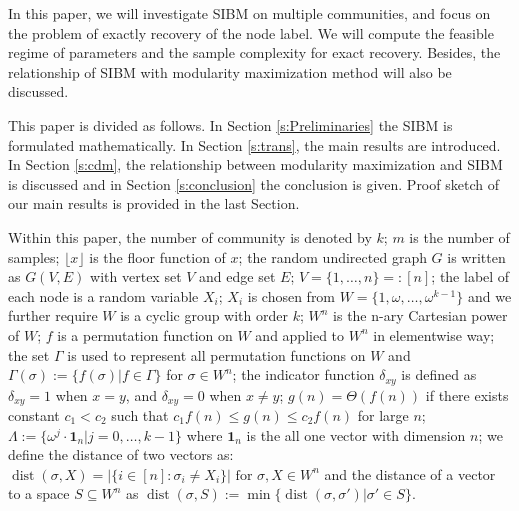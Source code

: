 \documentclass[conference]{IEEEtran}
\newcommand{\ide}[2]{ \delta_{#1 #2} }
\DeclareMathOperator{\dist}{dist}
\begin{document}
In this paper, we will investigate SIBM on multiple communities, and focus on the problem of exactly recovery of the node label.
We will compute the feasible regime of parameters and the sample complexity for exact recovery. Besides, the relationship of SIBM with modularity maximization method
will also be discussed. 

This paper is divided as follows. In Section \ref{s:Preliminaries} the SIBM is formulated mathematically.
In Section \ref{s:trans}, the main results are introduced.
In Section \ref{s:cdm}, the relationship between modularity maximization and SIBM is discussed 
and in Section \ref{s:conclusion} the conclusion is given.
Proof sketch of our main results is provided in the last Section.

Within this paper, the number of community is denoted by $k$; $m$ is the number of samples; $\lfloor x \rfloor$ is the floor function of $x$; the random undirected graph $G$ is written as $G(V,E)$ with vertex set $V$ and edge set $E$;
$V=\{1,\dots, n\} =: [n]$;
the label of each node is a random variable $X_i$; $X_i$ is chosen from $W= \{1, \omega, \dots, \omega^{k-1}\}$ and we further require $W$
is a cyclic group with order $k$; $W^n$ is the n-ary Cartesian power of $W$; $f$ is a permutation function on $W$ and applied to $W^n$ in elementwise way; the set $\Gamma$ is used to represent all permutation functions on $W$ and $\Gamma(\sigma):=\{f(\sigma)| f\in \Gamma\}$ for $\sigma \in W^n$; the indicator function $\ide{x}{y}$ is defined as
$\ide{x}{y} = 1 $ when $x=y$, and $\ide{x}{y}=0$ when $x\neq y$; $g(n) = \Theta(f(n))$ if there exists constant $c_1 < c_2$ such that $c_1 f(n) \leq g(n) \leq c_2 f(n)$
for large $n$;
$\Lambda := \{ \omega^j  \cdot \mathbf{1}_n | j=0, \dots,k-1\}$
where $\mathbf{1}_n$ is the all one vector with dimension $n$;
we define the distance of two vectors as:
$\dist(\sigma, X)
=|\{i\in[n]:\sigma_i\neq X_i\}| \textrm{ for } \sigma,X\in W^n
$ and the distance of a vector to a space $S\subseteq W^n$
as
$\dist(\sigma,S)
:=\min\{\dist(\sigma, \sigma') | \sigma' \in S\}
$.
\end{document}
